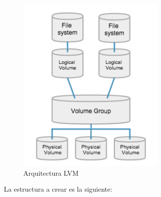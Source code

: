 \documentclass[12pt,spanish]{article}
\begin{document}
\begin{figure}[H]
  \centering
  \includegraphics[width=0.65\textwidth]{lvm.png}
  \caption{Arquitectura LVM}
\end{figure}
\newpage
La estructura a crear es la siguiente:
\end{document}

